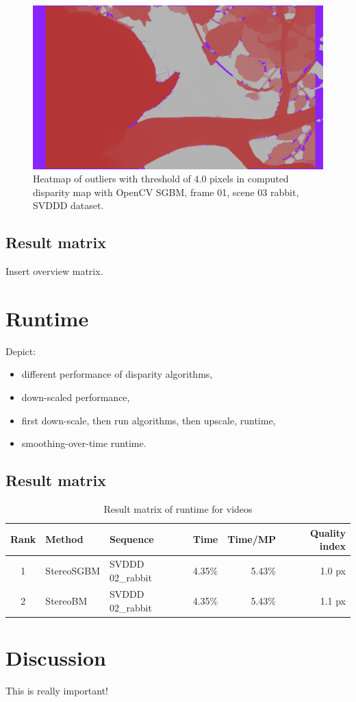 \begin{figure}[h!]
  \centering
  \includegraphics[width=1.0\textwidth]{src/images/svddd-03-heatmap-outliers.png}
  \caption{Heatmap of outliers with threshold of 4.0 pixels in computed disparity map with OpenCV SGBM, frame 01, scene 03 rabbit, SVDDD dataset.}
  \label{fig:svddd-07}
\end{figure}

\subsection*{Result matrix}

Insert overview matrix.

\section{Runtime}

Depict:

\begin{itemize}
  \item different performance of disparity algorithms,
  \item down-scaled performance,
  \item first down-scale, then run algorithms, then upscale, runtime,
  \item smoothing-over-time runtime.
\end{itemize}

\subsection*{Result matrix}

\begin{landscape}
  \begin{table}[h!]
  \centering
  \begin{tabular}{cll|rrr}
    \hline
    \textbf{Rank} & \textbf{Method} & \textbf{Sequence} &  \textbf{Time} & \textbf{Time/MP} & \textbf{Quality index} \\ \hline \hline
    1 & StereoSGBM & SVDDD 02\_rabbit & 4.35\% & \cellcolor{green!60}5.43\% & 1.0 px \\
    2 & StereoBM & SVDDD 02\_rabbit & 4.35\% & 5.43\% & \cellcolor{red!60}1.1 px \\ \hline
  \end{tabular}
  \caption{Result matrix of runtime for videos}
  \label{tab:result-videos-runtime}
  \end{table}
\end{landscape}

\section{Discussion}

This is really important!


